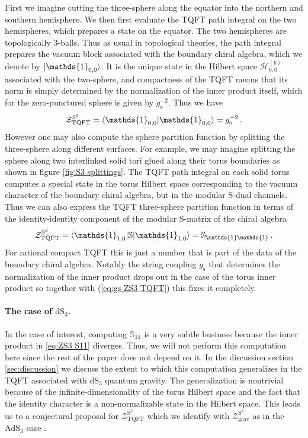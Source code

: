 \documentclass[12pt,a4paper]{article}
\newcommand{\id}{\mathds{1}}
\begin{document}
First we imagine cutting the three-sphere along the equator into the northern and southern hemisphere. We then first evaluate the TQFT path integral on the two hemispheres, which prepares a state on the equator.
The two hemispheres are topologically 3-balls. Thus as usual in topological theories, the path integral prepares the vacuum block associated with the boundary chiral algebra, which we denote by $\ket{\id_{0,0}}$. It is the unique state in the Hilbert space $\mathcal{H}_{0,0}^{(b)}$ associated with the two-sphere, and compactness of the TQFT means that its norm is simply determined by the normalization of the inner product itself, which for the zero-punctured sphere is given by $g_{\text{s}}^{-2}$. Thus we have
\begin{equation}\label{eq:gs ZS3 TQFT}
    \mathcal{Z}_{\text{TQFT}}^{\text{S}^3} = \braket{\id_{0,0}|\id_{0,0}} 
    = g_{\text{s}}^{-2}\, .
\end{equation}
However one may also compute the sphere partition function by splitting the three-sphere along different surfaces. For example, we may imagine splitting the sphere along two interlinked solid tori glued along their torus boundaries as shown in figure \ref{fig:S3 splittings}. The TQFT path integral on each solid torus computes a special state in the torus Hilbert space corresponding to the vacuum character of the boundary chiral algebra, but in the modular S-dual channels. Thus we can also express the TQFT three-sphere partition function in terms of the identity-identity component of the modular S-matrix of the chiral algebra
\begin{equation}
    \mathcal{Z}_{\text{TQFT}}^{\text{S}^3} = \braket{\id_{1,0}|\mathbb{S}|\id_{1,0}} = \mathbb{S}_{\id\id}\, . \label{eq:ZS3 S11}
\end{equation}
For rational compact TQFT this is just a number that is part of the data of the boundary chiral algebra. Notably the string coupling $g_{\text{s}}$ that determines the normalization of the inner product drops out in the case of the torus inner product so together with (\ref{eq:gs ZS3 TQFT}) this fixes it completely.


\paragraph{The case of $\mathrm{dS}_3$.} In the case of interest, computing $\mathbb{S}_{\id\id}$ is a very subtle business because the inner product in \eqref{eq:ZS3 S11} diverges. Thus, we will not perform this computation here since the rest of the paper does not depend on it. In the discussion section \ref{sec:discussion} we discuss the extent to which this computation generalizes in the TQFT associated with dS$_3$ quantum gravity. The generalization is nontrivial because of the infinite-dimensionality of the torus Hilbert space and the fact that the identity character is a non-normalizable state in the Hilbert space. This leads us to a conjectural proposal for $\mathcal{Z}_{\text{TQFT}}^{\text{S}^3}$ which we identify with $\mathcal{Z}_{\text{grav}}^{\text{S}^3}$ as in the $\text{AdS}_3$ case \cite{Collier:2023fwi}.
\end{document}
